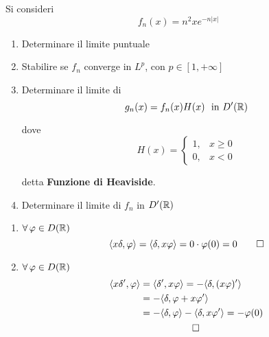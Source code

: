 Si consideri
\begin{equation*}
f_{n}(x) = n^{2} xe^{- n| x|}
\end{equation*}
\begin{enumerate}
\item Determinare il limite puntuale
\item Stabilire se $f_{n}$ converge in $L^{p}$, con $p\in [ 1, + \infty ]$
\item Determinare il limite di
\begin{equation*}
g_{n}(x) = f_{n}(x) H(x) \ \ \text{in} \ D'(\mathbb{R})
\end{equation*}

dove
\begin{equation*}
H(x) =
\begin{cases}
1, & x \geq 0\\
0, & x < 0
\end{cases}
\end{equation*}

detta \textbf{Funzione di Heaviside}.
\item Determinare il limite di $f_{n}$ in $D'(\mathbb{R})$
\end{enumerate}
\ParteSoluzioni
\Soluzione
\begin{enumerate}
\item $\forall \varphi \in D(\RR)$
\begin{equation*}
\langle x\delta, \varphi \rangle = \langle \delta, x\varphi \rangle = 0 \cdot \varphi (0) = 0\qed
\end{equation*}
\item $\forall \varphi \in D(\RR)$
\begin{gather*}
\begin{aligned}
\langle x\delta ', \varphi \rangle & = \langle \delta ', x\varphi \rangle = - \langle \delta, (x\varphi) '\rangle \\
 & = - \langle \delta, \varphi + x\varphi '\rangle \\
 & = - \langle \delta, \varphi \rangle - \langle \delta, x\varphi '\rangle = - \varphi (0)
\end{aligned}\\
\qed
\end{gather*}
\end{enumerate}
\Soluzione

